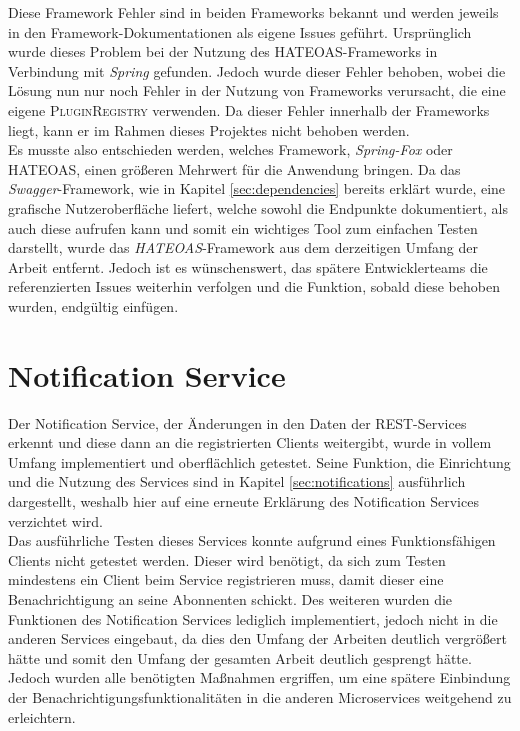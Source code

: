 \newpage
Diese Framework Fehler sind in beiden Frameworks bekannt und werden jeweils in den Framework-Dokumentationen als eigene Issues geführt\autocites[Siehe][]{hateoas_issue}[Siehe][]{swagger_issue}. Ursprünglich wurde dieses Problem bei der Nutzung des \ac{HATEOAS}-Frameworks in Verbindung mit \textit{Spring} gefunden\autocite[Siehe][]{spring_issue}. Jedoch wurde dieser Fehler behoben, wobei die Lösung nun nur noch Fehler in der Nutzung von Frameworks verursacht, die eine eigene \textsc{PluginRegistry} verwenden. Da dieser Fehler innerhalb der Frameworks liegt, kann er im Rahmen dieses Projektes nicht behoben werden.\\
\linebreak
Es musste also entschieden werden, welches Framework, \textit{Spring-Fox} oder \ac{HATEOAS}, einen größeren Mehrwert für die Anwendung bringen. Da das \textit{Swagger}-Framework, wie in Kapitel \ref{sec:dependencies} bereits erklärt wurde, eine grafische Nutzeroberfläche liefert, welche sowohl die Endpunkte dokumentiert, als auch diese aufrufen kann und somit ein wichtiges Tool zum einfachen Testen darstellt, wurde das \textit{HATEOAS}-Framework aus dem derzeitigen Umfang der Arbeit entfernt. Jedoch ist es wünschenswert, das spätere Entwicklerteams die referenzierten Issues weiterhin verfolgen und die Funktion, sobald diese behoben wurden, endgültig einfügen.

\section{Notification Service}

Der Notification Service, der Änderungen in den Daten der \ac{REST}-Services erkennt und diese dann an die registrierten Clients weitergibt, wurde in vollem Umfang implementiert und oberflächlich getestet. Seine Funktion, die Einrichtung und die Nutzung des Services sind in Kapitel \ref{sec:notifications} ausführlich dargestellt, weshalb hier auf eine erneute Erklärung des Notification Services verzichtet wird.\\
\linebreak
Das ausführliche Testen dieses Services konnte aufgrund eines Funktionsfähigen Clients nicht getestet werden. Dieser wird benötigt, da sich zum Testen mindestens ein Client beim Service registrieren muss, damit dieser eine Benachrichtigung an seine Abonnenten schickt. Des weiteren wurden die Funktionen des Notification Services lediglich implementiert, jedoch nicht in die anderen Services eingebaut, da dies den Umfang der Arbeiten deutlich vergrößert hätte und somit den Umfang der gesamten Arbeit deutlich gesprengt hätte. Jedoch wurden alle benötigten Maßnahmen ergriffen, um eine spätere Einbindung der Benachrichtigungsfunktionalitäten in die anderen Microservices weitgehend zu erleichtern. 